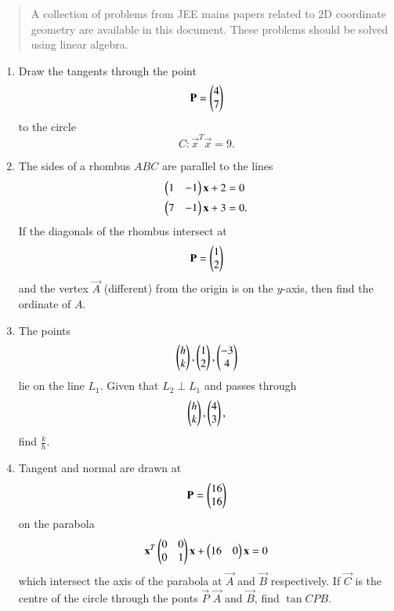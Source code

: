 \documentclass[journal,12pt,twocolumn]{IEEEtran}
\begin{document}
\begin{abstract}
	A  collection of problems from JEE mains papers related to 2D coordinate geometry are 
available in this document.  These problems should be solved using linear algebra.
\end{abstract}
\begin{enumerate}[label=\arabic*.]
\item Draw the tangents through the point 
\begin{equation}
\label{eq:circle_3_p}
\mathbf{P} = \begin{pmatrix}4\\7\end{pmatrix} 
\end{equation}
to the circle
\begin{equation}
\label{eq:circle_3}
C: \vec{x}^T\vec{x}  = 9.
\end{equation}
\item The sides of a rhombus $ABC$ are parallel to the lines
\begin{align}
\begin{pmatrix}1 & -1\end{pmatrix}\mathbf{x} + 2 &=0
\\
\begin{pmatrix}7 & -1\end{pmatrix}\mathbf{x} + 3 &=0.
\end{align}
If the diagonals of the rhombus intersect at
\begin{align}
\mathbf{P} = \begin{pmatrix}1 \\ 2\end{pmatrix}
\end{align}
and the vertex $\vec{A}$ (different) from the origin is on the $y$-axis, then find the ordinate of $A$.
\item The points 
%
\begin{align}
\begin{pmatrix}h \\ k\end{pmatrix},\begin{pmatrix}1 \\ 2\end{pmatrix},\begin{pmatrix}-3 \\ 4\end{pmatrix}
\end{align}
%
lie on the line $L_1$. Given that $L_2 \perp L_1$ and passes through 
\begin{align}
\begin{pmatrix}h \\ k\end{pmatrix},\begin{pmatrix}4 \\ 3\end{pmatrix},
\end{align}
find $\frac{k}{h}$.
%
\item Tangent and normal are drawn at 
\begin{equation}
\mathbf{P}= \begin{pmatrix}16 \\ 16\end{pmatrix}
\end{equation}
on the parabola 
\begin{equation}
\mathbf{x}^T\begin{pmatrix}0 & 0 \\ 0 & 1\end{pmatrix}\mathbf{x} + \begin{pmatrix}16 & 0\end{pmatrix}\mathbf{x} =0
\end{equation}
%
which intersect the axis of the parabola at $\vec{A}$ and $\vec{B}$ respectively.  If $\vec{C}$ is the centre 
of the circle through the ponts $\vec{P}$ $\vec{A}$ and $\vec{B}$, find $\tan  CPB$.


\end{enumerate}
\end{document}
